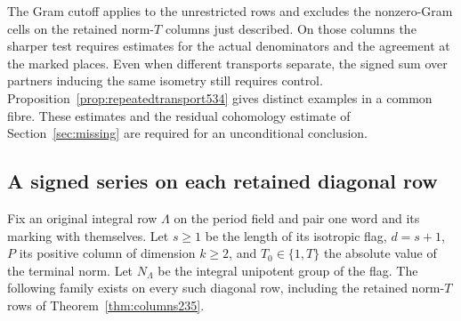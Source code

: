 \documentclass[a4paper,11pt]{article}
\theoremstyle{definition}
\theoremstyle{remark}
\numberwithin{equation}{section}
\begin{document}
The Gram cutoff applies to the unrestricted rows and excludes the
nonzero-Gram cells on the retained norm-\(T\) columns just described.
On those columns the sharper test requires estimates for the
actual denominators and the agreement at the marked places.
Even when different transports separate, the signed sum over
partners inducing the same isometry still requires control.
Proposition~\ref{prop:repeatedtransport534} gives distinct
examples in a common fibre. These estimates and the residual
cohomology estimate of Section~\ref{sec:missing} are required
for an unconditional conclusion.


\subsection{A signed series on each retained diagonal row}
\label{sec:diagonalseries536}

Fix an original integral row \(\Lambda\) on the period field
and pair one word and its marking with themselves. Let \(s\ge1\)
be the length of its isotropic flag, \(d=s+1\), \(P\) its
positive column of dimension \(k\ge2\), and \(T_0\in\{1,T\}\)
the absolute value of the terminal norm. Let \(N_\Lambda\) be
the integral unipotent group of the flag. The following family
exists on every such diagonal row, including the retained
norm-\(T\) rows of Theorem~\ref{thm:columns235}.
\end{document}
